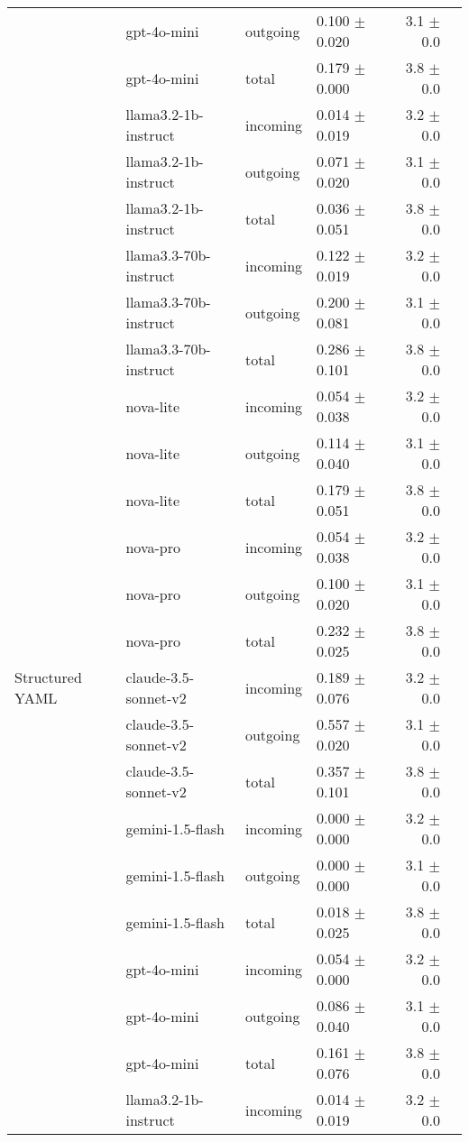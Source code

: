 \begin{table}[ht]
\begin{tabular}{llllrr}
 & gpt-4o-mini & outgoing & 0.100 $\pm$ 0.020 & 3.1 $\pm$ 0.0 \\
 & gpt-4o-mini & total & 0.179 $\pm$ 0.000 & 3.8 $\pm$ 0.0 \\
 & llama3.2-1b-instruct & incoming & 0.014 $\pm$ 0.019 & 3.2 $\pm$ 0.0 \\
 & llama3.2-1b-instruct & outgoing & 0.071 $\pm$ 0.020 & 3.1 $\pm$ 0.0 \\
 & llama3.2-1b-instruct & total & 0.036 $\pm$ 0.051 & 3.8 $\pm$ 0.0 \\
 & llama3.3-70b-instruct & incoming & 0.122 $\pm$ 0.019 & 3.2 $\pm$ 0.0 \\
 & llama3.3-70b-instruct & outgoing & 0.200 $\pm$ 0.081 & 3.1 $\pm$ 0.0 \\
 & llama3.3-70b-instruct & total & 0.286 $\pm$ 0.101 & 3.8 $\pm$ 0.0 \\
 & nova-lite & incoming & 0.054 $\pm$ 0.038 & 3.2 $\pm$ 0.0 \\
 & nova-lite & outgoing & 0.114 $\pm$ 0.040 & 3.1 $\pm$ 0.0 \\
 & nova-lite & total & 0.179 $\pm$ 0.051 & 3.8 $\pm$ 0.0 \\
 & nova-pro & incoming & 0.054 $\pm$ 0.038 & 3.2 $\pm$ 0.0 \\
 & nova-pro & outgoing & 0.100 $\pm$ 0.020 & 3.1 $\pm$ 0.0 \\
 & nova-pro & total & 0.232 $\pm$ 0.025 & 3.8 $\pm$ 0.0 \\
\midrule
Structured YAML & claude-3.5-sonnet-v2 & incoming & 0.189 $\pm$ 0.076 & 3.2 $\pm$ 0.0 \\
 & claude-3.5-sonnet-v2 & outgoing & 0.557 $\pm$ 0.020 & 3.1 $\pm$ 0.0 \\
 & claude-3.5-sonnet-v2 & total & 0.357 $\pm$ 0.101 & 3.8 $\pm$ 0.0 \\
 & gemini-1.5-flash & incoming & 0.000 $\pm$ 0.000 & 3.2 $\pm$ 0.0 \\
 & gemini-1.5-flash & outgoing & 0.000 $\pm$ 0.000 & 3.1 $\pm$ 0.0 \\
 & gemini-1.5-flash & total & 0.018 $\pm$ 0.025 & 3.8 $\pm$ 0.0 \\
 & gpt-4o-mini & incoming & 0.054 $\pm$ 0.000 & 3.2 $\pm$ 0.0 \\
 & gpt-4o-mini & outgoing & 0.086 $\pm$ 0.040 & 3.1 $\pm$ 0.0 \\
 & gpt-4o-mini & total & 0.161 $\pm$ 0.076 & 3.8 $\pm$ 0.0 \\
 & llama3.2-1b-instruct & incoming & 0.014 $\pm$ 0.019 & 3.2 $\pm$ 0.0 \\

\end{tabular}
\end{table}
